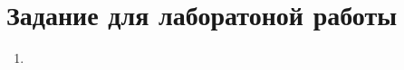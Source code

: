 \thispagestyle{empty}
\section*{Задание для лаборатоной работы}
\begin{enumerate}
    \item 
\end{enumerate}